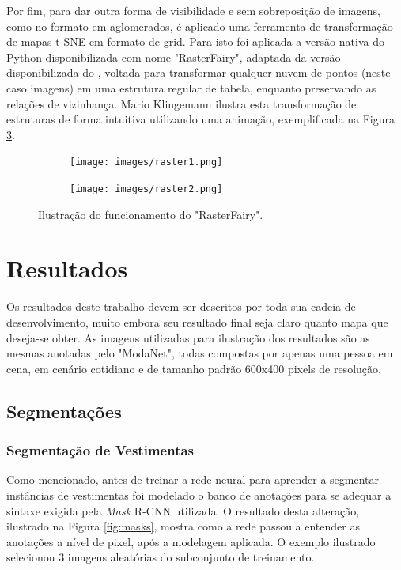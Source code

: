 \documentclass[12pt]{report}
\newcommand*{\captionsource}[2]{%
  \caption[{#1}]{%
    #1%
    \\\hspace{\linewidth}%
     \text{Fonte:}#2%
  }%
}
\begin{document}
Por fim, para dar outra forma de visibilidade e sem sobreposição de imagens, como no formato em aglomerados, é aplicado uma ferramenta de transformação de mapas \ac{t-SNE} em formato de grid. Para isto foi aplicada a versão nativa do Python disponibilizada com nome "RasterFairy", adaptada da versão disponibilizada do \cite{kogan}, voltada para transformar qualquer nuvem de pontos (neste caso imagens) em uma estrutura regular de tabela, enquanto preservando as relações de vizinhança. Mario Klingemann \cite{raster} ilustra esta transformação de estruturas de forma intuitiva utilizando uma animação, exemplificada na Figura \ref{fig:raster}. 

\begin{figure}
  \centering
  \begin{subfigure}[b]{0.4\textwidth}
  \centering
    \texttt{[image: images/raster1.png]}
    \label{fig:mask1}
  \end{subfigure}
  \centering
  \begin{subfigure}[b]{0.4\textwidth}
  \centering
    \texttt{[image: images/raster2.png]}
    \label{fig:mask3}
  \end{subfigure}
  \captionsource{Ilustração do funcionamento do "RasterFairy". }{ \protect\cite{raster}}
  \label{fig:raster}
\end{figure}


\chapter{Resultados}
\label{cha:resultados}

Os resultados deste trabalho devem ser descritos por toda sua cadeia de desenvolvimento, muito embora seu resultado final seja claro quanto mapa que deseja-se obter. As imagens utilizadas para ilustração dos resultados são as mesmas anotadas pelo "ModaNet", todas compostas por apenas uma pessoa em cena, em cenário cotidiano e de tamanho padrão 600x400 pixels de resolução.  

\section{Segmentações}

\subsection{Segmentação de Vestimentas}

Como mencionado, antes de treinar a rede neural para aprender a segmentar instâncias de vestimentas foi modelado o banco de anotações para se adequar a sintaxe exigida pela \textit{Mask} R-CNN utilizada. O resultado desta alteração, ilustrado na Figura \ref{fig:masks}, mostra como a rede passou a entender as anotações a nível de pixel, após a modelagem aplicada. O exemplo ilustrado selecionou 3 imagens aleatórias do subconjunto de treinamento.
\end{document}
